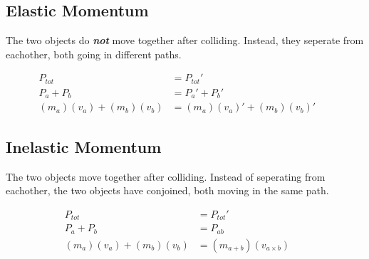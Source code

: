 \documentclass{article}
\begin{document}
\begin{adjustwidth}{1cm}{0pt}
    \subsection*{Elastic Momentum}
    \begin{flushleft}
        The two objects do \textbf{\textit{not}} move together after colliding. Instead, they seperate from eachother, both going in different paths.
    \end{flushleft}
    \begin{align*}
        P_{tot}                         & = P_{tot}\prime                                    \\
        P_{a} + P_{b}                   & = P_{a}\prime + P_{b}\prime                        \\
        (m_{a})(v_{a}) + (m_{b})(v_{b}) & = (m_{a})(v_{a})\prime + (m_{b})(v_{b})\prime &  &
    \end{align*}
    \vspace*{0.03cm}
    \subsection*{Inelastic Momentum}
    \begin{flushleft}
        The two objects move together after colliding. Instead of seperating from eachother, the two objects have conjoined, both moving in the same path.
    \end{flushleft}
    \begin{align*}
        P_{tot}                         & = P_{tot}\prime                   \\
        P_{a} + P_{b}                   & = P_{ab}                          \\
        (m_{a})(v_{a}) + (m_{b})(v_{b}) & = (m_{a + b})(v_{a\times b}) &  &
    \end{align*}
\end{adjustwidth}
\end{document}
